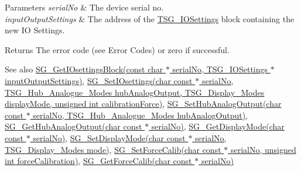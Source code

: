 \begin{DoxyParams}{Parameters}
{\em serial\+No} & The device serial no. \\
\hline
{\em input\+Output\+Settings} & The address of the \hyperlink{struct_t_s_g___i_o_settings}{T\+S\+G\+\_\+\+I\+O\+Settings} block containing the new IO Settings. \\
\hline
\end{DoxyParams}
\begin{DoxyReturn}{Returns}
The error code (see Error Codes) or zero if successful. 
\end{DoxyReturn}
\begin{DoxySeeAlso}{See also}
\hyperlink{group___t_cube_strain_gauge_ga82272877fefa4a5531f563a190f8b1e3}{S\+G\+\_\+\+Get\+I\+Osettings\+Block(const char $\ast$ serial\+No, T\+S\+G\+\_\+\+I\+O\+Settings $\ast$input\+Output\+Settings)}, \hyperlink{group___t_cube_strain_gauge_gaf816bcf97699810c3ad2e31f28bf136e}{S\+G\+\_\+\+Set\+I\+Osettings(char const $\ast$ serial\+No, T\+S\+G\+\_\+\+Hub\+\_\+\+Analogue\+\_\+\+Modes hub\+Analog\+Output, T\+S\+G\+\_\+\+Display\+\_\+\+Modes display\+Mode, unsigned int calibration\+Force)}, \hyperlink{group___t_cube_strain_gauge_ga5d177eb7c5912938daec784a38aae249}{S\+G\+\_\+\+Set\+Hub\+Analog\+Output(char const $\ast$ serial\+No, T\+S\+G\+\_\+\+Hub\+\_\+\+Analogue\+\_\+\+Modes hub\+Analog\+Output)}, \hyperlink{group___t_cube_strain_gauge_ga030582bb729784e5ae8ba7fe7e7ef1ed}{S\+G\+\_\+\+Get\+Hub\+Analog\+Output(char const $\ast$ serial\+No)}, \hyperlink{group___t_cube_strain_gauge_gaa5b67bce46e10d40186ad1d8f3febb15}{S\+G\+\_\+\+Get\+Display\+Mode(char const $\ast$ serial\+No)}, \hyperlink{group___t_cube_strain_gauge_ga97a7cb9056e7e4729a922eed5d1f7fcf}{S\+G\+\_\+\+Set\+Display\+Mode(char const $\ast$ serial\+No, T\+S\+G\+\_\+\+Display\+\_\+\+Modes mode)}, \hyperlink{group___t_cube_strain_gauge_gab197b2a6f5b56759db00a8b4d258e3d5}{S\+G\+\_\+\+Set\+Force\+Calib(char const $\ast$ serial\+No, unsigned int force\+Calibration)}, \hyperlink{group___t_cube_strain_gauge_ga9c470b12ed470678bd6e0e1fc2df3526}{S\+G\+\_\+\+Get\+Force\+Calib(char const $\ast$ serial\+No)}


\end{DoxySeeAlso}
